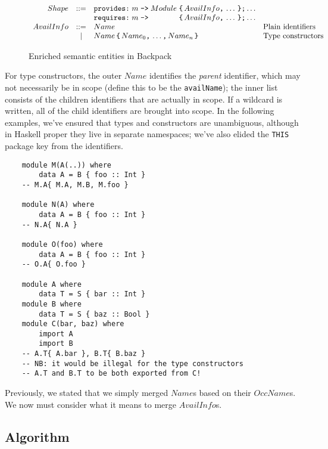 \documentclass{article}
\begin{document}
\begin{figure}[htpb]
$$
\begin{array}{rcll}
Shape & ::= & \verb|provides:|\; m \; \verb|->|\; Module\; \verb|{|\, AvailInfo \verb|,|\, \ldots \, \verb|};| \ldots \\
      &     & \verb|requires:| \; m \; \verb|->|\; \textcolor{white}{Module}\; \verb|{| \, AvailInfo \verb|,| \, \ldots \, \verb|}| \verb|;| \ldots \\
AvailInfo & ::= & Name & \mbox{Plain identifiers} \\
          & |   & Name \, \verb|{| \, Name_0\verb|,| \, \ldots\verb|,| \, Name_n \, \verb|}| & \mbox{Type constructors} \\
\end{array}
$$
\caption{Enriched semantic entities in Backpack} \label{fig:semantic2}
\end{figure}
%
For type constructors, the outer $Name$ identifies the \emph{parent}
identifier, which may not necessarily be in scope (define this to be the \texttt{availName}); the inner list consists
of the children identifiers that are actually in scope.  If a wildcard
is written, all of the child identifiers are brought into scope.
In the following examples, we've ensured that
types and constructors are unambiguous, although in Haskell proper they
live in separate namespaces; we've also elided the \verb|THIS| package
key from the identifiers.

\begin{verbatim}
    module M(A(..)) where
        data A = B { foo :: Int }
    -- M.A{ M.A, M.B, M.foo }

    module N(A) where
        data A = B { foo :: Int }
    -- N.A{ N.A }

    module O(foo) where
        data A = B { foo :: Int }
    -- O.A{ O.foo }

    module A where
        data T = S { bar :: Int }
    module B where
        data T = S { baz :: Bool }
    module C(bar, baz) where
        import A
        import B
    -- A.T{ A.bar }, B.T{ B.baz }
    -- NB: it would be illegal for the type constructors
    -- A.T and B.T to be both exported from C!
\end{verbatim}
%
Previously, we stated that we simply merged $Name$s based on their
$OccName$s.  We now must consider what it means to merge $AvailInfo$s.

\subsection{Algorithm}
\end{document}
